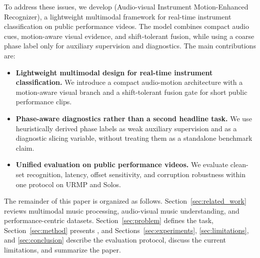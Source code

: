 To address these issues, we develop \method{} (Audio-visual Instrument Motion-Enhanced Recognizer), a lightweight multimodal framework for real-time instrument classification on public performance videos. The model combines compact audio cues, motion-aware visual evidence, and shift-tolerant fusion, while using a coarse phase label only for auxiliary supervision and diagnostics. The main contributions are:
\begin{itemize}[leftmargin=*]
    \item \textbf{Lightweight multimodal design for real-time instrument classification.} We introduce a compact audio-motion architecture with a motion-aware visual branch and a shift-tolerant fusion gate for short public performance clips.
    \item \textbf{Phase-aware diagnostics rather than a second headline task.} We use heuristically derived phase labels as weak auxiliary supervision and as a diagnostic slicing variable, without treating them as a standalone benchmark claim.
    \item \textbf{Unified evaluation on public performance videos.} We evaluate clean-set recognition, latency, offset sensitivity, and corruption robustness within one protocol on URMP and Solos.
\end{itemize}

The remainder of this paper is organized as follows. Section~\ref{sec:related_work} reviews multimodal music processing, audio-visual music understanding, and performance-centric datasets. Section~\ref{sec:problem} defines the task, Section~\ref{sec:method} presents \method{}, and Sections~\ref{sec:experiments}, \ref{sec:limitations}, and \ref{sec:conclusion} describe the evaluation protocol, discuss the current limitations, and summarize the paper.
